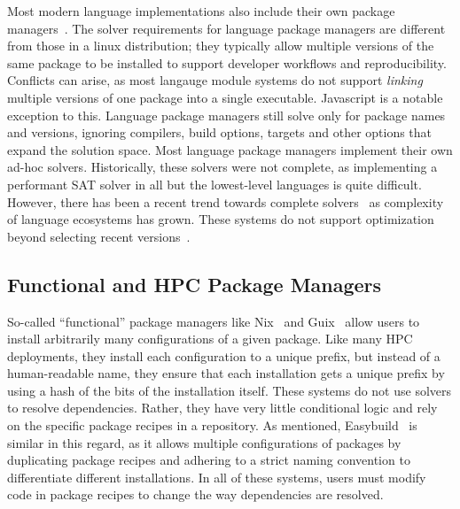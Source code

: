 Most modern language implementations also include their own package
managers~\cite{npm,pip,cargo,weizenbaum:pubgrub18}. The solver requirements for language
package managers are different from those in a linux distribution; they typically allow
multiple versions of the same package to be installed to support developer workflows and
reproducibility. Conflicts can arise, as most langauge module systems do not support
{\it linking} multiple versions of one package into a single executable. Javascript is a
notable exception to this. Language package managers still solve only for package
names and versions, ignoring compilers, build options, targets and other options that
expand the solution space. Most language package managers implement their own ad-hoc
solvers. Historically, these solvers were not complete, as
implementing a performant SAT solver in all but the lowest-level languages is quite
difficult. However, there has been a recent trend towards complete
solvers~\cite{pip-new-resolver,weizenbaum:pubgrub18} as complexity of language
ecosystems has grown. These systems do not support optimization beyond selecting recent
versions~\cite{abate2020dependency}.

\subsection{Functional and HPC Package Managers}

So-called ``functional'' package managers like
Nix~\cite{dolstra+:icfp08,dolstra+:lisa04} and Guix~\cite{courtes-guix-2015} allow users
to install arbitrarily many configurations of a given package. Like many HPC
deployments, they install each configuration to a unique prefix, but instead of a
human-readable name, they ensure that each installation gets a unique prefix by using a
hash of the bits of the installation itself. These systems do not use solvers to resolve
dependencies. Rather, they have very little conditional logic and rely on the specific
package recipes in a repository. As mentioned, Easybuild~\cite{hoste+:pyhpc12} is
similar in this regard, as it allows multiple configurations of packages by duplicating
package recipes and adhering to a strict naming convention to differentiate different
installations. In all of these systems, users must modify code in package recipes to
change the way dependencies are resolved.
